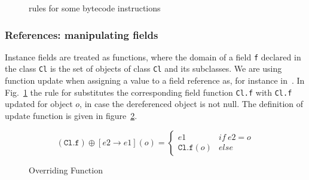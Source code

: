 \begin{figure}[ht]


\caption{rules for some bytecode instructions}
\label{instrWP}
\end{figure}

\subsubsection{References: manipulating fields}
Instance fields are treated as functions, where the domain of a field \texttt{f} 
declared in the class \texttt{Cl} is the set of objects of class \texttt{Cl} and its subclasses.
We are using function update when assigning a value to a field reference as, for instance in~\cite{B00ppp}. 
In Fig.~\ref{instrWP} the rule for  substitutes the corresponding field function \texttt{Cl.f} with \texttt{Cl.f} updated for object $o$, in case the dereferenced object is not null. The definition of update function is given in figure~\ref{override}.

\begin{figure}
$$
 (\texttt{Cl.f})\oplus[e2 \rightarrow e1](o) = \left\{ \begin{array} {ll}
						       e1 & if \ e2 = o \\
					               \texttt{Cl.f}(o)	& else 
	\end{array}\right. 
$$ 
\caption{Overriding Function}
\label{override}
\end{figure}

